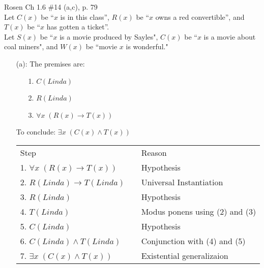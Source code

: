 \begin{questions}
 Rosen Ch 1.6 \#14 (a,c), p. 79 \\
Let $C(x)$ be ``$x$ is in this class'', $R(x)$ be ``$x$ owns a red convertible'', and $T(x)$ be ``$x$ has gotten a ticket''. \\
Let $S(x)$ be ``$x$ is a movie produced by Sayles", $C(x)$ be ``$x$ is a movie about coal miners", and $W(x)$ be ``movie $x$ is wonderful."
    \ifprintanswers
        \vspace{-15pt}
    \fi
  \begin{solution}
    \begin{itemize}[itemsep=0pt,parsep=0pt,topsep=0pt,partopsep=0pt]
    \item[(a):] The premises are:
    \begin{itemize}[itemsep=0pt,parsep=0pt,topsep=0pt,partopsep=0pt]
        \item[1.] $C(Linda)$
        \item[2.] $R(Linda)$
        \item[3.] $\forall x\; (R(x) \rightarrow T(x))$
    \end{itemize}
    To conclude: $\exists x\; (C(x) \wedge T(x))$

    \smallskip
    \begin{tabular}{lll}
        Step        & \hspace{0.2in} & Reason \\
        1. $\forall x\; (R(x) \rightarrow T(x))$    &   & Hypothesis \\
        2. $R(Linda) \rightarrow T(Linda)$          &   & Universal Instantiation \\
        3. $R(Linda)$                               &   & Hypothesis \\
        4. $T(Linda)$                               &   & Modus ponens using (2) and (3) \\
        5. $C(Linda)$                               &   & Hypothesis \\
        6. $C(Linda) \wedge T(Linda)$               &   & Conjunction with (4) and (5) \\
        7. $\exists x\; (C(x) \wedge T(x))$         &   & Existential generalizaion \\
    \end{tabular}



\end{itemize}
\end{solution}
\end{questions}
